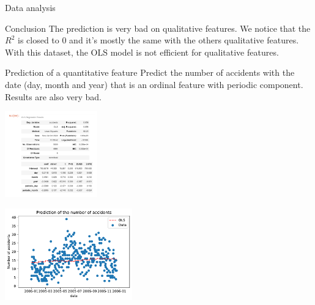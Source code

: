 \documentclass[unknownkeysallowed]{beamer}
\begin{document}
\begin{frame}{Data analysis}

\begin{block}{Conclusion}
The prediction is very bad on qualitative features. We notice that the $R^2$ is closed to 0 and it's mostly the same with the others qualitative features. With this dataset, the OLS model is not efficient for qualitative features.

\end{block}

\begin{block}{Prediction of a quantitative feature}
Predict the number of accidents with the date (day, month and year) that is an ordinal feature with periodic component. Results are also very bad.

\end{block}

\begin{minipage}[c]{.36\linewidth}
     \begin{center}
             \includegraphics[width=4cm]{stat_model_number1}
         \end{center}
   \end{minipage} \hfill
   \begin{minipage}[c]{.55\linewidth}
    \begin{center}
            \includegraphics[width=5.5cm]{accidentprediction}

        \end{center}

 \end{minipage}

\end{frame}
\end{document}
